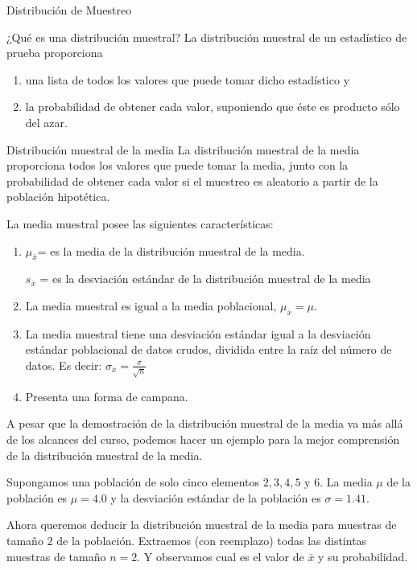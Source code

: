 \documentclass[
  10pt,
  ignorenonframetext,
]{beamer}
\providecommand{\tightlist}{%
  \setlength{\itemsep}{0pt}\setlength{\parskip}{0pt}}
\begin{document}
\begin{frame}{Distribución de Muestreo}
\protect\hypertarget{distribuciuxf3n-de-muestreo}{}
\begin{block}{¿Qué es una distribución muestral?}
\protect\hypertarget{quuxe9-es-una-distribuciuxf3n-muestral}{}
La distribución muestral de un estadístico de prueba proporciona

\begin{enumerate}
\tightlist
\item
  una lista de todos los valores que puede tomar dicho estadístico y
\item
  la probabilidad de obtener cada valor, suponiendo que éste es producto
  sólo del azar.
\end{enumerate}
\end{block}
\end{frame}

\begin{frame}{Distribución muestral de la media}
\protect\hypertarget{distribuciuxf3n-muestral-de-la-media}{}
La distribución muestral de la media proporciona todos los valores que
puede tomar la media, junto con la probabilidad de obtener cada valor si
el muestreo es aleatorio a partir de la población hipotética.

La media muestral posee las siguientes características:

\begin{enumerate}
\item
  \(\mu_{\bar{x}}\)= es la media de la distribución muestral de la
  media.

  \(s_{\bar{x}}\) = es la desviación estándar de la distribución
  muestral de la media
\item
  La media muestral es igual a la media poblacional,
  \(\mu_{\bar{x}}=\mu\).
\item
  La media muestral tiene una desviación estándar igual a la desviación
  estándar poblacional de datos crudos, dividida entre la raíz del
  número de datos. Es decir:
  \(\sigma_{\bar{x}}=\frac{\sigma}{\sqrt{n}}\)
\item
  Presenta una forma de campana.
\end{enumerate}
\end{frame}

\begin{frame}{}
\protect\hypertarget{section-13}{}
A pesar que la demostración de la distribución muestral de la media va
más allá de los alcances del curso, podemos hacer un ejemplo para la
mejor comprensión de la distribución muestral de la media.

Supongamos una población de solo cinco elementos
\(2, 3, 4, 5 \mbox{ y } 6\). La media \(\mu\) de la población es
\(\mu = 4.0\) y la desviación estándar de la población es
\(\sigma = 1.41\).

Ahora queremos deducir la distribución muestral de la media para
muestras de tamaño \(2\) de la población. Extraemos (con reemplazo)
todas las distintas muestras de tamaño \(n = 2\). Y observamos cual es
el valor de \(\bar{x}\) y su probabilidad.
\end{frame}
\end{document}
